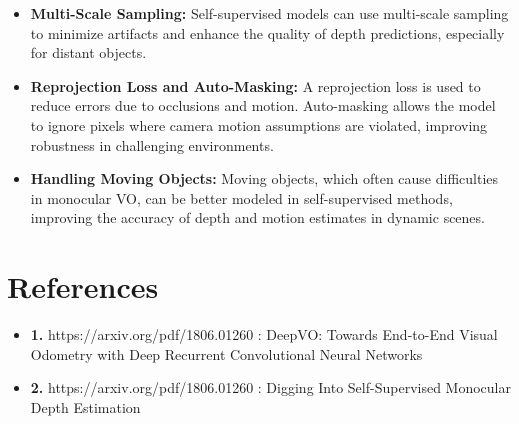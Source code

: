 \documentclass[12pt]{article}
\begin{document}
\begin{itemize}
    \item \textbf{Multi-Scale Sampling:} Self-supervised models can use multi-scale sampling to minimize artifacts and enhance the quality of depth predictions, especially for distant objects.
    \item \textbf{Reprojection Loss and Auto-Masking:} A reprojection loss is used to reduce errors due to occlusions and motion. Auto-masking allows the model to ignore pixels where camera motion assumptions are violated, improving robustness in challenging environments.
    \item \textbf{Handling Moving Objects:} Moving objects, which often cause difficulties in monocular VO, can be better modeled in self-supervised methods, improving the accuracy of depth and motion estimates in dynamic scenes.
\end{itemize}

\section{References}
\begin{itemize}
\item \textbf{1.} https://arxiv.org/pdf/1806.01260 : DeepVO: Towards End-to-End Visual Odometry with Deep Recurrent Convolutional Neural Networks

\item \textbf{2.} https://arxiv.org/pdf/1806.01260 : Digging Into Self-Supervised Monocular Depth Estimation
\end{itemize}
\end{document}
